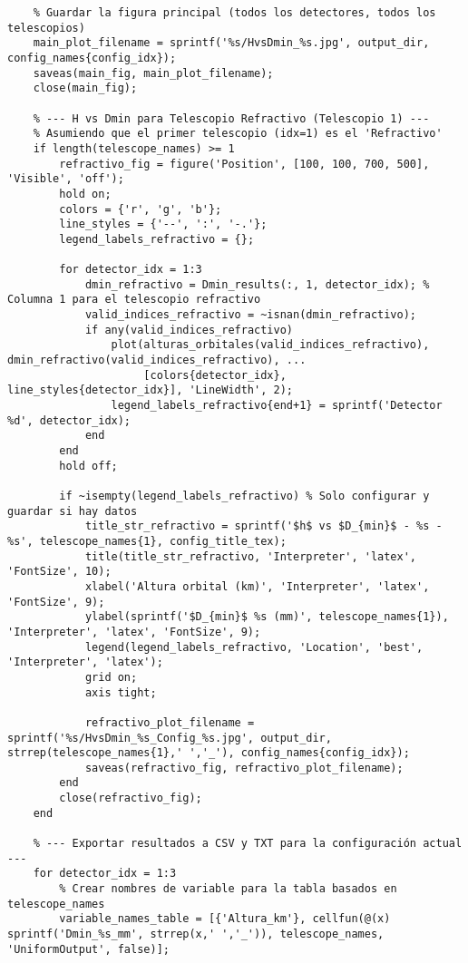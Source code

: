 \begin{verbatim}
    % Guardar la figura principal (todos los detectores, todos los telescopios)
    main_plot_filename = sprintf('%s/HvsDmin_%s.jpg', output_dir, config_names{config_idx});
    saveas(main_fig, main_plot_filename);
    close(main_fig);

    % --- H vs Dmin para Telescopio Refractivo (Telescopio 1) ---
    % Asumiendo que el primer telescopio (idx=1) es el 'Refractivo'
    if length(telescope_names) >= 1 
        refractivo_fig = figure('Position', [100, 100, 700, 500], 'Visible', 'off');
        hold on;
        colors = {'r', 'g', 'b'};
        line_styles = {'--', ':', '-.'};
        legend_labels_refractivo = {};

        for detector_idx = 1:3
            dmin_refractivo = Dmin_results(:, 1, detector_idx); % Columna 1 para el telescopio refractivo
            valid_indices_refractivo = ~isnan(dmin_refractivo);
            if any(valid_indices_refractivo)
                plot(alturas_orbitales(valid_indices_refractivo), dmin_refractivo(valid_indices_refractivo), ...
                     [colors{detector_idx}, line_styles{detector_idx}], 'LineWidth', 2);
                legend_labels_refractivo{end+1} = sprintf('Detector %d', detector_idx);
            end
        end
        hold off;

        if ~isempty(legend_labels_refractivo) % Solo configurar y guardar si hay datos
            title_str_refractivo = sprintf('$h$ vs $D_{min}$ - %s - %s', telescope_names{1}, config_title_tex);
            title(title_str_refractivo, 'Interpreter', 'latex', 'FontSize', 10);
            xlabel('Altura orbital (km)', 'Interpreter', 'latex', 'FontSize', 9);
            ylabel(sprintf('$D_{min}$ %s (mm)', telescope_names{1}), 'Interpreter', 'latex', 'FontSize', 9);
            legend(legend_labels_refractivo, 'Location', 'best', 'Interpreter', 'latex');
            grid on;
            axis tight;
            
            refractivo_plot_filename = sprintf('%s/HvsDmin_%s_Config_%s.jpg', output_dir, strrep(telescope_names{1},' ','_'), config_names{config_idx});
            saveas(refractivo_fig, refractivo_plot_filename);
        end
        close(refractivo_fig);
    end

    % --- Exportar resultados a CSV y TXT para la configuración actual ---
    for detector_idx = 1:3
        % Crear nombres de variable para la tabla basados en telescope_names
        variable_names_table = [{'Altura_km'}, cellfun(@(x) sprintf('Dmin_%s_mm', strrep(x,' ','_')), telescope_names, 'UniformOutput', false)];
        

\end{verbatim}
